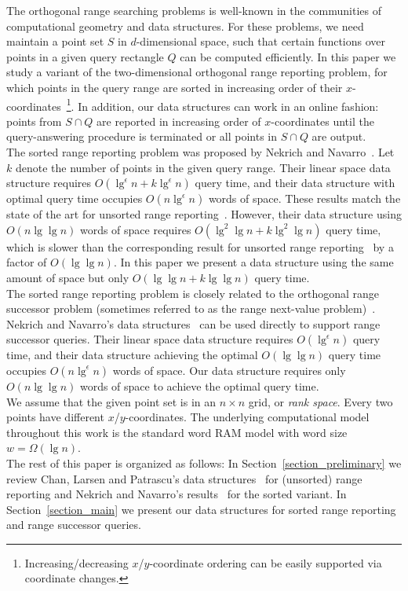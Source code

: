 \documentclass{llncs}
\begin{document}
The orthogonal range searching problems is well-known in the communities of computational geometry and data structures.
For these problems, we need maintain a point set $S$ in $d$-dimensional space,
such that certain functions over points in a given query rectangle $Q$ can be computed efficiently.
In this paper we study a variant of the two-dimensional orthogonal range reporting problem,
for which points in the query range are sorted in increasing order of their
$x$-coordinates~\footnote{Increasing/decreasing $x$/$y$-coordinate ordering can be easily supported via coordinate changes.}.
In addition, our data structures can work in an online fashion:
points from $S \cap Q$ are reported in increasing order of $x$-coordinates
until the query-answering procedure is terminated or all points in $S \cap Q$ are output. \\
\indent The sorted range reporting problem was proposed by Nekrich and Navarro~\cite{DBLP:conf/swat/NekrichN12}.
Let $k$ denote the number of points in the given query range.
Their linear space data structure requires $O(\lg^\epsilon n + k \lg^\epsilon n)$ query time,
and their data structure with optimal query time occupies $O(n\lg^\epsilon n)$ words of space.
These results match the state of the art for unsorted range reporting~\cite{DBLP:conf/compgeom/ChanLP11}.
However, their data structure using $O(n\lg\lg n)$ words of space requires $O(\lg^2\lg n + k \lg^2\lg n)$ query time,
which is slower than the corresponding result for unsorted range reporting~\cite{DBLP:conf/compgeom/ChanLP11} by a factor of $O(\lg\lg n)$.
In this paper we present a data structure using the same amount of space but only $O(\lg\lg n + k\lg\lg n)$ query time. \\
\indent The sorted range reporting problem is closely related to the orthogonal range successor problem
(sometimes referred to as the range next-value problem)~\cite{DBLP:conf/stacs/IliopoulosCKRW08,DBLP:journals/comgeo/YuHW11,DBLP:conf/swat/NekrichN12}.
Nekrich and Navarro's data structures~\cite{DBLP:conf/swat/NekrichN12} can be used directly to support range successor queries.
Their linear space data structure requires $O(\lg^\epsilon n)$ query time,
and their data structure achieving the optimal $O(\lg\lg n)$ query time occupies $O(n\lg^\epsilon n)$ words of space.
Our data structure requires only $O(n\lg\lg n)$ words of space to achieve the optimal query time. \\
\indent We assume that the given point set is in an $n\times n$ grid, or \emph{rank space}.
Every two points have different $x$/$y$-coordinates.
The underlying computational model throughout this work is the standard word RAM model with word size $w = \Omega(\lg n)$. \\
\indent The rest of this paper is organized as follows:
In Section~\ref{section_preliminary} we review Chan, Larsen and Patrascu's data structures~\cite{DBLP:conf/compgeom/ChanLP11} for (unsorted) range reporting
and Nekrich and Navarro's results~\cite{DBLP:conf/swat/NekrichN12} for the sorted variant.
In Section~\ref{section_main} we present our data structures for sorted range reporting and range successor queries.
\end{document}
